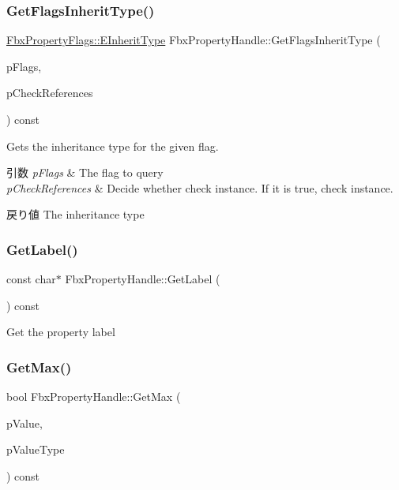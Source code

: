 \subsubsection{\texorpdfstring{Get\+Flags\+Inherit\+Type()}{GetFlagsInheritType()}}
{\footnotesize\ttfamily \hyperlink{class_fbx_property_flags_ae3b667a4fcac4b827fa186a698fec2f8}{Fbx\+Property\+Flags\+::\+E\+Inherit\+Type} Fbx\+Property\+Handle\+::\+Get\+Flags\+Inherit\+Type (\begin{DoxyParamCaption}\item[{\hyperlink{class_fbx_property_flags_afabfa7e0949aac8a7dcdf8a141867e99}{Fbx\+Property\+Flags\+::\+E\+Flags}}]{p\+Flags,  }\item[{bool}]{p\+Check\+References }\end{DoxyParamCaption}) const}

Gets the inheritance type for the given flag. 
\begin{DoxyParams}{引数}
{\em p\+Flags} & The flag to query \\
\hline
{\em p\+Check\+References} & Decide whether check instance. If it is true, check instance. \\
\hline
\end{DoxyParams}
\begin{DoxyReturn}{戻り値}
The inheritance type 
\end{DoxyReturn}
\mbox{\label{class_fbx_property_handle_a2ae2817fc9113f00ad3b212de3acfad7}} 
\subsubsection{\texorpdfstring{Get\+Label()}{GetLabel()}}
{\footnotesize\ttfamily const char$\ast$ Fbx\+Property\+Handle\+::\+Get\+Label (\begin{DoxyParamCaption}{ }\end{DoxyParamCaption}) const}



Get the property label 

\mbox{\label{class_fbx_property_handle_a4752eebe7303b15577355b8fbecd4c6b}} 
\subsubsection{\texorpdfstring{Get\+Max()}{GetMax()}\hspace{0.1cm}{\footnotesize\ttfamily [1/2]}}
{\footnotesize\ttfamily bool Fbx\+Property\+Handle\+::\+Get\+Max (\begin{DoxyParamCaption}\item[{void $\ast$}]{p\+Value,  }\item[{\hyperlink{fbxpropertytypes_8h_a73913a5ddfb20e57c6f25e9e6784bd92}{E\+Fbx\+Type}}]{p\+Value\+Type }\end{DoxyParamCaption}) const}

